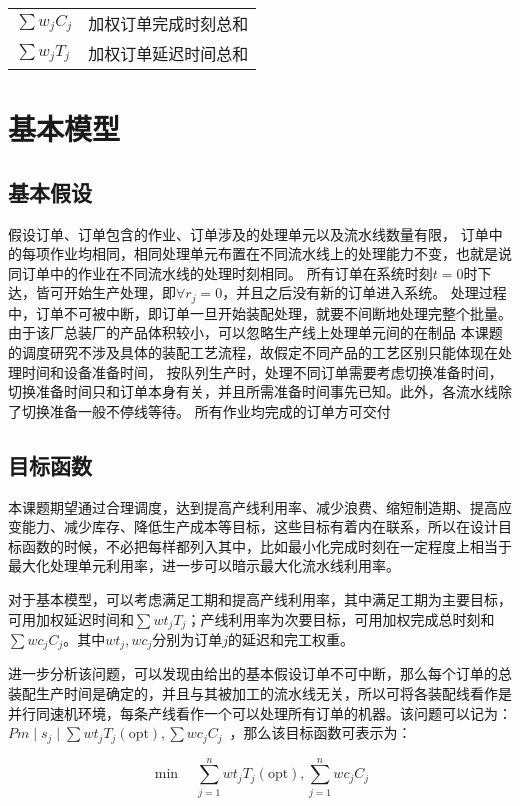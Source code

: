 \begin{tabular}{ll}
$\sum w_jC_j$ & 加权订单完成时刻总和 \\
$\sum w_jT_j$ & 加权订单延迟时间总和%
\end{tabular}

\section{基本模型}
\subsection{基本假设}
假设订单、订单包含的作业、订单涉及的处理单元以及流水线数量有限，
订单中的每项作业均相同，相同处理单元布置在不同流水线上的处理能力不变，也就是说同订单中的作业在不同流水线的处理时刻相同。
所有订单在系统时刻$t = 0$时下达，皆可开始生产处理，即$\forall r_j =0$，并且之后没有新的订单进入系统。
处理过程中，订单不可被中断，即订单一旦开始装配处理，就要不间断地处理完整个批量。
由于该厂总装厂的产品体积较小，可以忽略生产线上处理单元间的在制品
本课题的调度研究不涉及具体的装配工艺流程，故假定不同产品的工艺区别只能体现在处理时间和设备准备时间，
按队列生产时，处理不同订单需要考虑切换准备时间，切换准备时间只和订单本身有关，并且所需准备时间事先已知。此外，各流水线除了切换准备一般不停线等待。
所有作业均完成的订单方可交付

\subsection{目标函数}
本课题期望通过合理调度，达到提高产线利用率、减少浪费、缩短制造期、提高应变能力、减少库存、降低生产成本等目标，这些目标有着内在联系，所以在设计目标函数的时候，不必把每样都列入其中，比如最小化完成时刻在一定程度上相当于最大化处理单元利用率，进一步可以暗示最大化流水线利用率。

对于基本模型，可以考虑满足工期和提高产线利用率，其中满足工期为主要目标，可用加权延迟时间和$\sum wt_jT_j$；产线利用率为次要目标，可用加权完成总时刻和$\sum wc_jC_j$。其中$wt_j, wc_j$分别为订单$j$的延迟和完工权重。

进一步分析该问题，可以发现由给出的基本假设订单不可中断，那么每个订单的总装配生产时间是确定的，并且与其被加工的流水线无关，所以可将各装配线看作是并行同速机环境，每条产线看作一个可以处理所有订单的机器。该问题可以记为：$Pm \mid s_j\mid\sum wt_jT_j(\text{opt}), \sum wc_jC_j$\ ，那么该目标函数可表示为：

\begin{equation}
\min\quad \sum_{j = 1}^n wt_jT_j(\text{opt}), \sum_{j=1}^n wc_jC_j
\label{equ:primeobj}
\end{equation}

